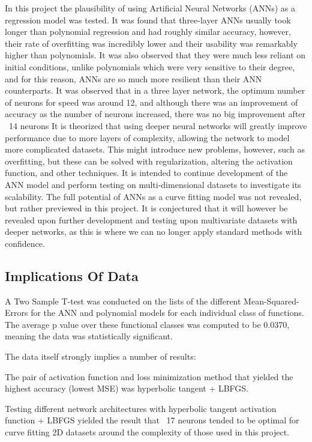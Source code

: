 \documentclass{article}
\begin{document}
In this project the plausibility of using Artificial Neural Networks (ANNs) as a regression model was tested. It was found that three-layer ANNs usually took longer than polynomial regression and had roughly similar accuracy, however, their rate of overfitting was incredibly lower and their usability was remarkably higher than polynomials. It was also observed that they were much less reliant on initial conditions, unlike polynomials which were very sensitive to their degree, and for this reason, ANNs are so much more resilient than their ANN counterparts.
It was observed that in a three layer network, the optimum number of neurons for speed was around 12, and although there was an improvement of accuracy as the number of neurons increased, there was no big improvement after ~14 neurons
It is theorized that using deeper neural networks will greatly improve performance due to more layers of complexity, allowing the network to model more complicated datasets. This might introduce new problems, however, such as overfitting, but these can be solved with regularization, altering the activation function, and other techniques.
It is intended to continue development of the ANN model and perform testing on multi-dimensional datasets to investigate its scalability. The full potential of ANNs as a curve fitting model was not revealed, but rather previewed in this project. It is conjectured that it will however be revealed upon further development and testing upon multivariate datasets with deeper networks, as this is where we can no longer apply standard methods with confidence.


\subsection{Implications Of Data}

A Two Sample T-test was conducted on the lists of the different Mean-Squared-Errors for the ANN and polynomial models for each individual class of functions. The average p value over these functional classes was computed to be 0.0370, meaning the data was statistically significant.

The data itself strongly implies a number of results:

The pair of activation function and loss minimization method that yielded the highest accuracy (lowest MSE) was hyperbolic tangent + LBFGS.

Testing different network architectures with hyperbolic tangent activation function + LBFGS yielded the result that ~17 neurons tended to be optimal for curve fitting 2D datasets around the complexity of those used in this project.
\end{document}
